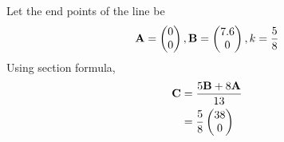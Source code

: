 
Let the end points of the line be 
\begin{align}
\mathbf{A} = \begin{pmatrix}0\\0\end{pmatrix}, \mathbf{B} = \begin{pmatrix}7.6\\0\end{pmatrix}, k = \frac{5}{8}
\end{align}
Using section formula, 
\begin{align}
\label{eq:line_section_form}
\mathbf{C} &= \frac{5 \mathbf{B} + 8\mathbf{A}}{13}
\\
	&= \frac{5}{8}\begin{pmatrix}38\\0\end{pmatrix}
\end{align}
